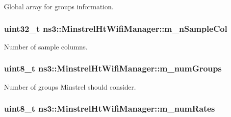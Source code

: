 Global array for groups information. 

\subsubsection[{\texorpdfstring{m\+\_\+n\+Sample\+Col}{m_nSampleCol}}]{\setlength{\rightskip}{0pt plus 5cm}uint32\+\_\+t ns3\+::\+Minstrel\+Ht\+Wifi\+Manager\+::m\+\_\+n\+Sample\+Col\hspace{0.3cm}{\ttfamily [private]}}\hypertarget{classns3_1_1MinstrelHtWifiManager_afc2db9ea273b3599cb09ccbf73f866e0}{}\label{classns3_1_1MinstrelHtWifiManager_afc2db9ea273b3599cb09ccbf73f866e0}


Number of sample columns. 

\subsubsection[{\texorpdfstring{m\+\_\+num\+Groups}{m_numGroups}}]{\setlength{\rightskip}{0pt plus 5cm}uint8\+\_\+t ns3\+::\+Minstrel\+Ht\+Wifi\+Manager\+::m\+\_\+num\+Groups\hspace{0.3cm}{\ttfamily [private]}}\hypertarget{classns3_1_1MinstrelHtWifiManager_a8a0964148ee665bab466b2858e8094b7}{}\label{classns3_1_1MinstrelHtWifiManager_a8a0964148ee665bab466b2858e8094b7}


Number of groups Minstrel should consider. 

\subsubsection[{\texorpdfstring{m\+\_\+num\+Rates}{m_numRates}}]{\setlength{\rightskip}{0pt plus 5cm}uint8\+\_\+t ns3\+::\+Minstrel\+Ht\+Wifi\+Manager\+::m\+\_\+num\+Rates\hspace{0.3cm}{\ttfamily [private]}}\hypertarget{classns3_1_1MinstrelHtWifiManager_a2f3d0e7f6c298a40dbc8699805103142}{}\label{classns3_1_1MinstrelHtWifiManager_a2f3d0e7f6c298a40dbc8699805103142}


